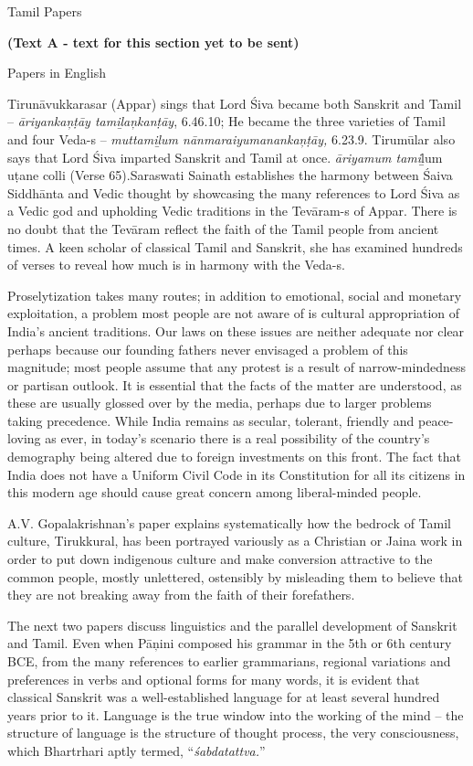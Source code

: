 Tamil Papers

\textbf{(Text A - text for this section yet to be sent)}

Papers in English

Tirunāvukkarasar (Appar) sings that Lord Śiva became both Sanskrit and Tamil – \textit{āriyankaņṭāy tamiḻaņkanṭāy}, 6.46.10; He became the three varieties of Tamil and four Veda-s -- \textit{muttamiḻum nānmaraiyumanankaņṭāy,} 6.23.9. Tirumūlar also says that Lord Śiva imparted Sanskrit and Tamil at once. \textit{āriyamum tami}ḻum uṭane colli (Verse 65).Saraswati Sainath establishes the harmony between Śaiva Siddhānta and Vedic thought by showcasing the many references to Lord Śiva as a Vedic god and upholding Vedic traditions in the Tevāram-s of Appar. There is no doubt that the Tevāram reflect the faith of the Tamil people from ancient times. A keen scholar of classical Tamil and Sanskrit, she has examined hundreds of verses to reveal how much is in harmony with the Veda-s.

Proselytization takes many routes; in addition to emotional, social and monetary exploitation, a problem most people are not aware of is cultural appropriation of India’s ancient traditions. Our laws on these issues are neither adequate nor clear perhaps because our founding fathers never envisaged a problem of this magnitude; most people assume that any protest is a result of narrow-mindedness or partisan outlook. It is essential that the facts of the matter are understood, as these are usually glossed over by the media, perhaps due to larger problems taking precedence. While India remains as secular, tolerant, friendly and peace-loving as ever, in today’s scenario there is a real possibility of the country’s demography being altered due to foreign investments on this front. The fact that India does not have a Uniform Civil Code in its Constitution for all its citizens in this modern age should cause great concern among liberal-minded people.

A.V. Gopalakrishnan’s paper explains systematically how the bedrock of Tamil culture, Tirukkural, has been portrayed variously as a Christian or Jaina work in order to put down indigenous culture and make conversion attractive to the common people, mostly unlettered, ostensibly by misleading them to believe that they are not breaking away from the faith of their forefathers.

The next two papers discuss linguistics and the parallel development of Sanskrit and Tamil. Even when Pāņini composed his grammar in the 5th or 6th century BCE, from the many references to earlier grammarians, regional variations and preferences in verbs and optional forms for many words, it is evident that classical Sanskrit was a well-established language for at least several hundred years prior to it. Language is the true window into the working of the mind – the structure of language is the structure of thought process, the very consciousness, which Bhartrhari aptly termed, “\textit{śabdatattva.}”

